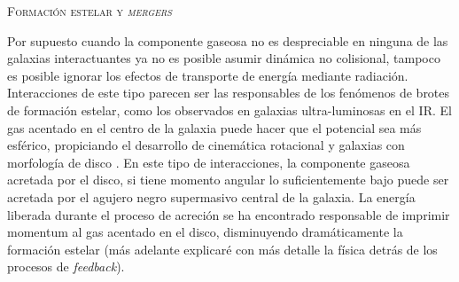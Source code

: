 \documentclass[xcolor=dvipsnames,4pt,hyperref={colorlinks,citecolor=black,linkcolor=black,urlcolor=black}]{beamer}
\begin{document}
\begin{frame}[allowframebreaks]{\textsc{Formación estelar y \emph{mergers}}}
\begin{description}
Por supuesto cuando la componente gaseosa no es despreciable en ninguna de las galaxias
interactuantes ya no es posible asumir dinámica no colisional, tampoco es posible ignorar los
efectos de transporte de energía mediante radiación. Interacciones de este tipo parecen ser las
responsables de los fenómenos de brotes de formación estelar, como los observados en galaxias
ultra-luminosas en el IR. El gas acentado en el centro de la galaxia puede hacer que el potencial
sea más esférico, propiciando el desarrollo de cinemática rotacional y galaxias con morfología de
disco \citep{Jesseit2007}. En este tipo de interacciones, la componente gaseosa acretada por el
disco, si tiene momento angular lo suficientemente bajo puede ser acretada por el agujero negro
supermasivo central de la galaxia. La energía liberada durante el proceso de acreción se ha
encontrado responsable de imprimir momentum al gas acentado en el disco, disminuyendo dramáticamente
la formación estelar (más adelante explicaré con más detalle la física detrás de los procesos de
\emph{feedback}).
%
\end{description}
%
\end{frame}
\end{document}
